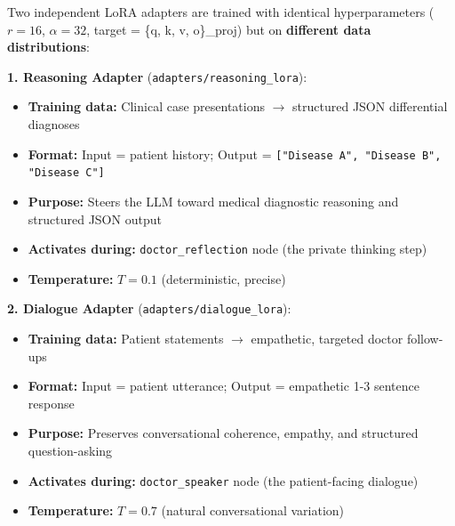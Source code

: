 \begin{acadbox}[\textcolor{white}{Academic Definition}]
Two independent LoRA adapters are trained with identical hyperparameters ($r = 16$, $\alpha = 32$, target = \{q, k, v, o\}\_proj) but on \textbf{different data distributions}:

\textbf{1. Reasoning Adapter} (\texttt{adapters/reasoning\_lora}):
\begin{itemize}
    \item \textbf{Training data:} Clinical case presentations $\rightarrow$ structured JSON differential diagnoses
    \item \textbf{Format:} Input = patient history; Output = \texttt{["Disease A", "Disease B", "Disease C"]}
    \item \textbf{Purpose:} Steers the LLM toward medical diagnostic reasoning and structured JSON output
    \item \textbf{Activates during:} \texttt{doctor\_reflection} node (the private thinking step)
    \item \textbf{Temperature:} $T = 0.1$ (deterministic, precise)
\end{itemize}

\textbf{2. Dialogue Adapter} (\texttt{adapters/dialogue\_lora}):
\begin{itemize}
    \item \textbf{Training data:} Patient statements $\rightarrow$ empathetic, targeted doctor follow-ups
    \item \textbf{Format:} Input = patient utterance; Output = empathetic 1-3 sentence response
    \item \textbf{Purpose:} Preserves conversational coherence, empathy, and structured question-asking
    \item \textbf{Activates during:} \texttt{doctor\_speaker} node (the patient-facing dialogue)
    \item \textbf{Temperature:} $T = 0.7$ (natural conversational variation)
\end{itemize}
\end{acadbox}

